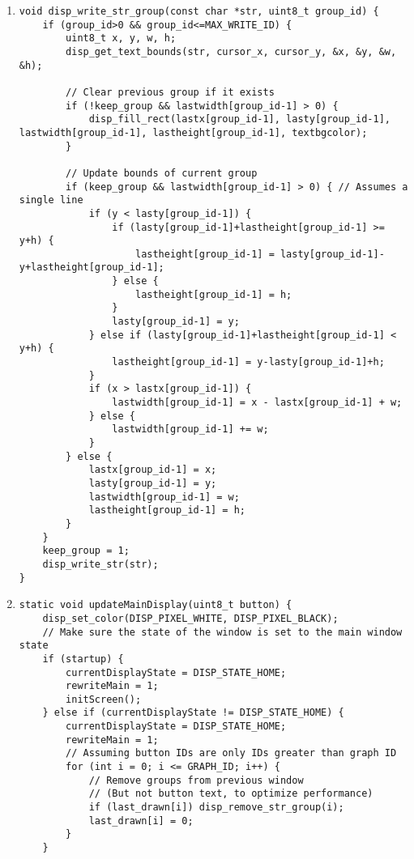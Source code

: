 \begin{enumerate}[label=\textbf{S.\arabic*},ref=S.\arabic*{ of Appendix A}]
\item \label{disp_write_str_group}
\begin{adjustwidth}{-2em}{0pt}
\singlespacing
\nl
\begin{lstlisting}
void disp_write_str_group(const char *str, uint8_t group_id) {
    if (group_id>0 && group_id<=MAX_WRITE_ID) {
        uint8_t x, y, w, h;
        disp_get_text_bounds(str, cursor_x, cursor_y, &x, &y, &w, &h);

        // Clear previous group if it exists
        if (!keep_group && lastwidth[group_id-1] > 0) {
            disp_fill_rect(lastx[group_id-1], lasty[group_id-1], lastwidth[group_id-1], lastheight[group_id-1], textbgcolor);
        }

        // Update bounds of current group
        if (keep_group && lastwidth[group_id-1] > 0) { // Assumes a single line
            if (y < lasty[group_id-1]) {
                if (lasty[group_id-1]+lastheight[group_id-1] >= y+h) {
                    lastheight[group_id-1] = lasty[group_id-1]-y+lastheight[group_id-1];
                } else {
                    lastheight[group_id-1] = h;
                }
                lasty[group_id-1] = y;
            } else if (lasty[group_id-1]+lastheight[group_id-1] < y+h) {
                lastheight[group_id-1] = y-lasty[group_id-1]+h;
            }
            if (x > lastx[group_id-1]) {
                lastwidth[group_id-1] = x - lastx[group_id-1] + w;
            } else {
                lastwidth[group_id-1] += w;
            }
        } else {
            lastx[group_id-1] = x;
            lasty[group_id-1] = y;
            lastwidth[group_id-1] = w;
            lastheight[group_id-1] = h;
        }
    }
    keep_group = 1;
    disp_write_str(str);
}
\end{lstlisting}
\end{adjustwidth}
\doublespacing

\item \label{updateMainDisplay}
\begin{adjustwidth}{-2em}{0pt}
\singlespacing
\nl
\begin{lstlisting}
static void updateMainDisplay(uint8_t button) {
    disp_set_color(DISP_PIXEL_WHITE, DISP_PIXEL_BLACK);
    // Make sure the state of the window is set to the main window state
    if (startup) {
        currentDisplayState = DISP_STATE_HOME;
        rewriteMain = 1;
        initScreen();
    } else if (currentDisplayState != DISP_STATE_HOME) {
        currentDisplayState = DISP_STATE_HOME;
        rewriteMain = 1;
        // Assuming button IDs are only IDs greater than graph ID
        for (int i = 0; i <= GRAPH_ID; i++) {
            // Remove groups from previous window
            // (But not button text, to optimize performance)
            if (last_drawn[i]) disp_remove_str_group(i);
            last_drawn[i] = 0;
        }
    }


\end{lstlisting}
\end{adjustwidth}
\end{enumerate}
